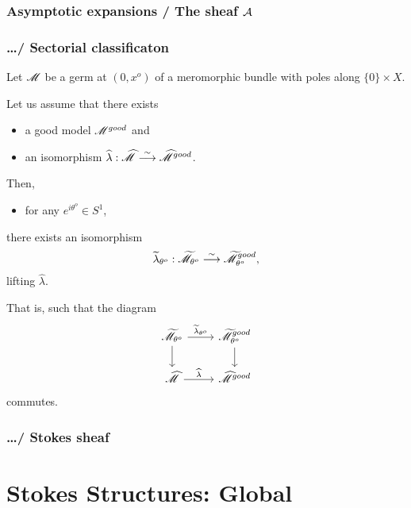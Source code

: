 \subsection{Asymptotic expansions / The sheaf $\mathcal{A}$}

\subsection{\dots / Sectorial classificaton} %
\begin{paracol}{2} %
  \switchcolumn{} %
  Let $\mathscr{M}$ be a germ at $(0,x^o)$ of a meromorphic bundle with poles along
  $\{0\}\times X$.
  \begin{thm}[II.5.12]
    Let us assume that there exists
    \begin{itemize}
      \item a good model $\mathscr{M}^{good}$ and
      \item an isomorphism $\widehat\lambda: \widehat{\mathscr{M}}
        \overset{\sim}{\longrightarrow}\widehat{\mathscr{M}}^{good}$.
    \end{itemize}
    Then,
    \begin{itemize}
      \item for any $e^{i\theta^o}\in S^1$,
    \end{itemize}
    there exists an isomorphism
    \[
      \widetilde\lambda_{\theta^o}: \widetilde{\mathscr{M}}_{\theta^o}
      \overset{\sim}{\longrightarrow}\widetilde{\mathscr{M}}^{good}_{\theta^o},
    \]
    lifting $\hat\lambda$.
  \end{thm}
  That is, such that the diagram
  \[ \begin{tikzcd}
      \tilde\sM_{\theta^o} \dar \rar{\tilde\lambda_{\theta^o}} &
        \tilde\sM^{good}_{\theta^o} \dar
        \\\hat\sM \rar{\hat\lambda} &
        \hat\sM^{good}
  \end{tikzcd} \]
  commutes.
\end{paracol} %

\subsection{\dots / Stokes sheaf}

\chapter{Stokes Structures: Global}
